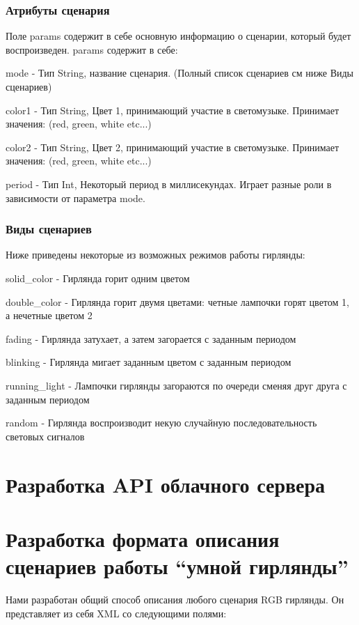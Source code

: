 \subsubsection{Атрибуты сценария}

Поле params содержит в себе основную информацию о сценарии, который будет воспроизведен. params содержит в себе:

mode - Тип String, название сценария. (Полный список сценариев см ниже Виды сценариев)

color1 - Тип String, Цвет 1, принимающий участие в светомузыке. Принимает значения: (red, green, white etc...)

color2 - Тип String, Цвет 2, принимающий участие в светомузыке. Принимает значения: (red, green, white etc...)

period - Тип Int, Некоторый период в миллисекундах. Играет разные роли в зависимости от параметра mode.

\subsubsection{Виды сценариев}

Ниже приведены некоторые из возможных режимов работы гирлянды:

solid\_color - Гирлянда горит одним цветом

double\_color - Гирлянда горит двумя цветами: четные лампочки горят цветом 1, а нечетные цветом 2

fading - Гирлянда затухает, а затем загорается с заданным периодом

blinking - Гирлянда мигает заданным цветом с заданным периодом

running\_light - Лампочки гирлянды загораются по очереди сменяя друг друга с заданным периодом

random - Гирлянда воспроизводит некую случайную последовательность световых сигналов


 
\section{Разработка API облачного сервера}
  
\section{Разработка формата описания сценариев работы ``умной гирлянды''}  

Нами разработан общий способ описания любого сценария RGB гирлянды. Он представляет из себя XML со следующими полями:

